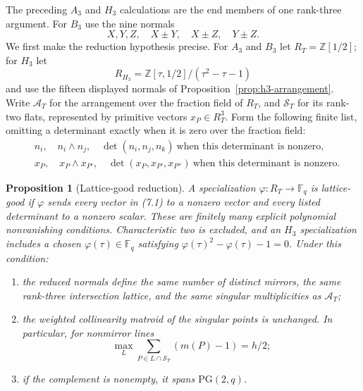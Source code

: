 \documentclass[11pt]{article}
\newtheorem{proposition}[theorem]{Proposition}
\theoremstyle{definition}
\theoremstyle{remark}
\newcommand{\PG}{\mathrm{PG}}
\newcommand{\F}{\mathbb{F}}
\begin{document}
The preceding $A_3$ and $H_3$ calculations are the end members of one
rank-three argument.  For $B_3$ use the nine normals
\[
 X,Y,Z,\quad X\mathbin{\pm}Y,\quad X\mathbin{\pm}Z,\quad
 Y\mathbin{\pm}Z .
\]
We first make the reduction hypothesis precise.  For $A_3$ and $B_3$ let
$R_T=\mathbb Z[1/2]$; for $H_3$ let
\[
 R_{H_3}=\mathbb Z[\tau,1/2]/(\tau^2-\tau-1)
\]
and use the fifteen displayed normals of
Proposition~\ref{prop:h3-arrangement}.  Write $\mathcal A_T$ for the
arrangement over the fraction field of $R_T$, and $\mathcal S_T$ for its
rank-two flats, represented by primitive vectors $x_P\in R_T^3$.
Form the following finite list, omitting a determinant exactly when it is
zero over the fraction field:
\[
\begin{split}
 &n_i,\quad n_i\wedge n_j,\quad
   \det(n_i,n_j,n_k)\ \text{when this determinant is nonzero},\\
 &x_P,\quad x_P\wedge x_{P'},\quad
   \det(x_P,x_{P'},x_{P''})\
   \text{when this determinant is nonzero}.
\end{split}                                                   \tag{7.1}
\]

\begin{proposition}[Lattice-good reduction]
\label{prop:lattice-good}
A specialization $\varphi:R_T\to\F_q$ is \emph{lattice-good} if
$\varphi$ sends every vector in (7.1) to a nonzero vector and every listed
determinant to a nonzero scalar.  These are finitely many explicit
polynomial nonvanishing conditions.  Characteristic two is excluded, and an
$H_3$ specialization includes a chosen
$\varphi(\tau)\in\F_q$ satisfying $\varphi(\tau)^2-\varphi(\tau)-1=0$.
Under this condition:
\begin{enumerate}[label=\textup{(\roman*)},leftmargin=*]
\item the reduced normals define the same number of distinct mirrors, the
same rank-three intersection lattice, and the same singular
multiplicities as $\mathcal A_T$;
\item the weighted collinearity matroid of the singular points is
unchanged.  In particular, for nonmirror lines
\[
 \max_L\sum_{P\in L\cap\mathcal S_T}(m(P)-1)=h/2;
\]
\item if the complement is nonempty, it spans $\PG(2,q)$.
\end{enumerate}
\end{proposition}
\end{document}

